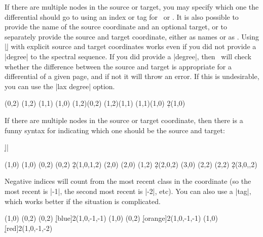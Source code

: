 \begin{sseqdata}[name = basic, cohomological Serre grading]
\begin{commandlist}
If there are multiple nodes in the source or target, you may specify which one
the differential should go to using an index or tag for \sourcen\  or \targetn.
It is also possible to provide the name of the source coordinate and an optional
target, or to separately provide the source and target coordinate, either as
names or as . Using |\d| with explicit source and target
coordinates works even if you did not provide a |degree| to the spectral
sequence. If you did provide a |degree|, then \sseqpages\  will check whether
the difference between the source and target is appropriate for a differential
of a given page, and if not it will throw an error. If this is undesirable, you
can use the |lax degree| option.
\begin{codeexample}[width = 7.5cm]
\begin{sseqdata}[ name = d example, degree = {-1}{#1},
                  struct lines = blue, yscale = 1.3 ]
\class(0,2)
\class(1,2)
\class(1,1)
\class(1,0)
\structline(1,2)(0,2)
\structline(1,2)(1,1)
\structline(1,1)(1,0)
\d2(1,0)
\end{sseqdata}
\printpage[ name = d example, page = 2 ] \quad
\printpage[ name = d example, page = 3 ]
\end{codeexample}
If there are multiple nodes in the source or target coordinate, then there is a
funny syntax for indicating which one should be the source and target:
\begin{center}
|\d{}|
\end{center}
\begin{codeexample}[width = 7.5cm]
\begin{sseqpage}[ Adams grading, yscale = 0.8 ]
\class(1,0) \class(1,0)
\class(0,2) \class(0,2)
\d2(1,0,1,2)
\class(2,0) \class(2,0)
\class(1,2)
\d2(2,0,2)
\class(3,0)
\class(2,2) \class(2,2)
\d2(3,0,,2)
\end{sseqpage}
\end{codeexample}
Negative indices will count from the most recent class in the coordinate (so the
most recent is |-1|, the second most recent is |-2|, etc). You can also use a
|tag|, which works better if the situation is complicated.
\begin{codeexample}[width = 7.5cm]
\begin{sseqpage}[ Adams grading, yscale = 0.65 ]
\class(1,0)
\class(0,2) \class(0,2)
\d[blue]2(1,0,-1,-1)
\class(1,0)
\class(0,2)
\d[orange]2(1,0,-1,-1)
\class(1,0)
\d[red]2(1,0,-1,-2)
\end{sseqpage}
\end{codeexample}
\end{commandlist}


\end{sseqdata}
